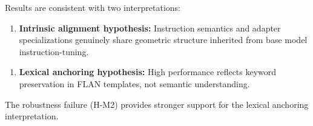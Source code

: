 Results are consistent with two interpretations:

\begin{enumerate}
\item \textbf{Intrinsic alignment hypothesis:} Instruction semantics and adapter specializations genuinely share geometric structure inherited from base model instruction-tuning.
\end{enumerate}

\begin{enumerate}
\item \textbf{Lexical anchoring hypothesis:} High performance reflects keyword preservation in FLAN templates, not semantic understanding.
\end{enumerate}

The robustness failure (H-M2) provides stronger support for the lexical anchoring interpretation.
